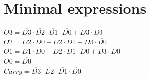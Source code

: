 \documentclass [15pt,a4paper,twoside]{article}
\begin{document}
\section{Minimal expressions}
$O3 =  \overline{D3}  \cdot  \overline{D2}  \cdot  \overline{D1}  \cdot  \overline{D0} +D3 \cdot D0$~\\
$O2 = D2 \cdot D0+D2 \cdot D1+D3 \cdot  \overline{D0} $~\\
$O1 = D1 \cdot D0+D2 \cdot  \overline{D1}  \cdot  \overline{D0} +D3 \cdot  \overline{D0} $~\\
$O0 =  \overline{D0} $~\\
$Carry =  \overline{D3}  \cdot  \overline{D2}  \cdot  \overline{D1}  \cdot  \overline{D0} $~\\
\end{document}
